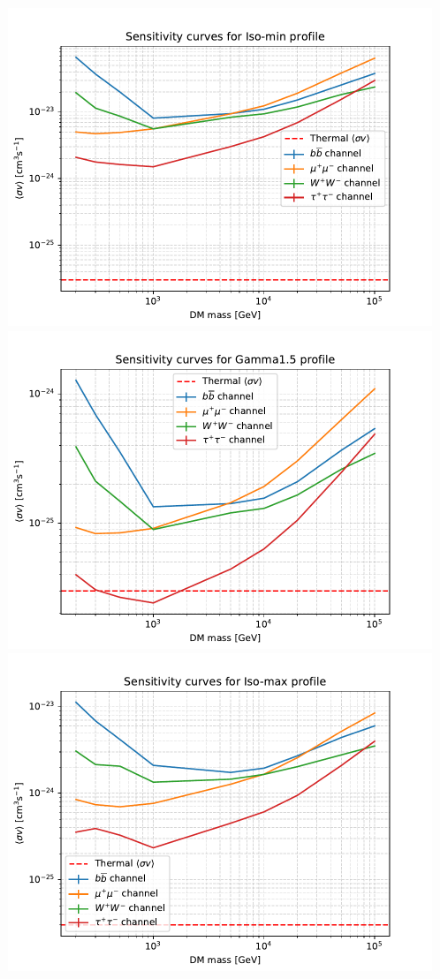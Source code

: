 \documentclass[main.tex]{subfiles}
\begin{document}
\begin{figure}
\endminipage
{}
\includegraphics[width=1\textwidth]{Pictures/Limits_Iso-min.pdf}
\endminipage \\
\includegraphics[width=1\textwidth]{Pictures/Limits_Gamma1-5.pdf}
\endminipage
{}
\includegraphics[width=1\textwidth]{Pictures/Limits_Iso-max.pdf}

\end{figure}
\end{document}
